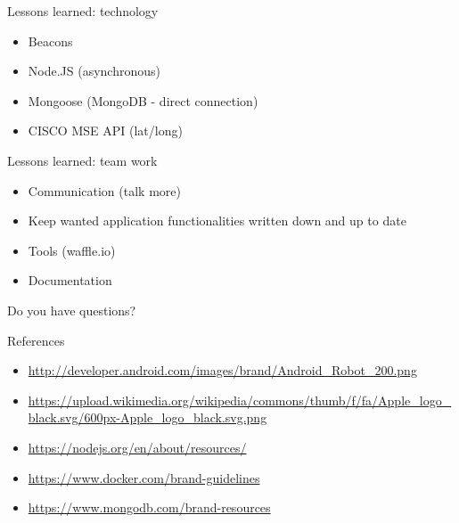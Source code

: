 \documentclass[11pt]{beamer}
\newcommand{\todo}[1]{\raisebox{0pt}{\parbox{0pt}{\begin{large}\colorbox{red}{todo: #1}\end{large} \hspace*{0.05cm}}}}
\begin{document}
\begin{frame}{Lessons learned: technology}

  \begin{itemize}
    \item Beacons
    \item Node.JS (asynchronous)
    \item Mongoose (MongoDB - direct connection)
    \item CISCO MSE API (lat/long)
  \end{itemize}

\end{frame}

\begin{frame}{Lessons learned: team work}

  \begin{itemize}
    \item Communication (talk more)
    \item Keep wanted application functionalities written down and up to date
    \item Tools (waffle.io)
    \item Documentation
  \end{itemize}

\end{frame}


\begin{frame}{}

	\begin{center}

		{\Huge Do you have questions?}

    \end{center}

\end{frame}


\begin{frame}[allowframebreaks]{References}

	\nocite{*}
	{\tiny }


  {\tiny
    \begin{itemize}
      \item \url{http://developer.android.com/images/brand/Android_Robot_200.png}
      \item \url{https://upload.wikimedia.org/wikipedia/commons/thumb/f/fa/Apple_logo_black.svg/600px-Apple_logo_black.svg.png}
      \item \url{https://nodejs.org/en/about/resources/}
      \item \url{https://www.docker.com/brand-guidelines}
      \item \url{https://www.mongodb.com/brand-resources}
    \end{itemize}
  }
\end{frame}
\end{document}
